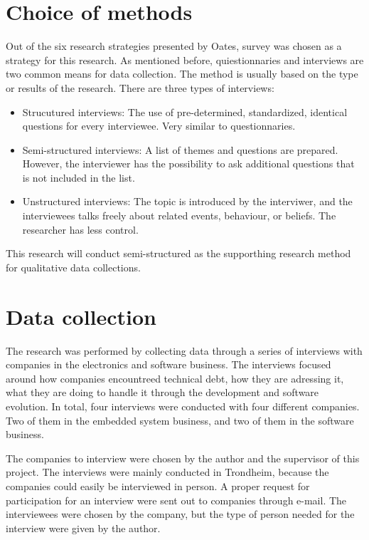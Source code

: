 \section{Choice of methods}
Out of the six research strategies presented by Oates\cite{Oates:2006:RIS:1202299}, survey was chosen as a strategy for this research. As mentioned before, quiestionnaries and interviews are two common means for data collection\cite{Wohlin:2000:ESE:330775}. The method is usually based on the type or results of the research. There are three types of interviews\cite{Oates:2006:RIS:1202299}:
\begin{itemize}
	\item Strucutured interviews: The use of pre-determined, standardized, identical questions for every interviewee. Very similar to questionnaries.
	\item Semi-structured interviews: A list of themes and questions are prepared. However, the interviewer has the possibility to ask additional questions that is not included in the list.
	\item Unstructured interviews: The topic is introduced by the interviwer, and the interviewees talks freely about related events, behaviour, or beliefs. The researcher has less control. 
\end{itemize}

This research will conduct semi-structured as the supporthing research method for qualitative data collections. 

\section{Data collection}
The research was performed by collecting data through a series of interviews with companies in the electronics and software business. The interviews focused around how companies encountreed technical debt, how they are adressing it, what they are doing to handle it through the development and software evolution. In total, four interviews were conducted with four different companies. Two of them in the embedded system business, and two of them in the software business.

The companies to interview were chosen by the author and the supervisor of this project. The interviews were mainly conducted in Trondheim, because the companies could easily be interviewed in person. A proper request for participation for an interview were sent out to companies through e-mail. The interviewees were chosen by the company, but the type of person needed for the interview were given by the author.

